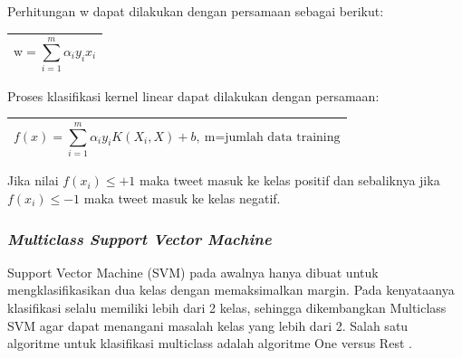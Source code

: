 \noindent Perhitungan w dapat dilakukan dengan persamaan sebagai berikut:	
\begin{table}[H]
	\small
	\begin{adjustbox}{width=1\textwidth}
	\begin{tabular}{|p{13.55cm}|}
		\hline
		\begin{equation}\label{eqn:weight}
			\textrm{w} = \sum_{i=1}^{m} \alpha_i  y_i x_i
		\end{equation}\\
		\hline
	\end{tabular}
	\end{adjustbox}
\end{table}
\noindent Proses klasifikasi kernel linear dapat dilakukan dengan persamaan:
\begin{table}[H]
	\small
	\begin{adjustbox}{width=1\textwidth}
	\begin{tabular}{|p{13.55cm}|}
		\hline
		\begin{equation}\label{eqn:f(x)}
	f(x)=\sum_{i=1}^{m}\alpha_i y_i K(X_i,X)+b,\ \textrm{m=jumlah data training}
		\end{equation}\\
		\hline
	\end{tabular}
	\end{adjustbox}
\end{table}
Jika nilai $f(x_i )\leq+1$ maka tweet masuk ke kelas positif dan sebaliknya jika $f(x_i )\leq-1$ maka tweet masuk ke kelas negatif. 

\subsubsection{\textit{Multiclass Support Vector Machine}}
Support Vector Machine (SVM) pada awalnya hanya dibuat untuk mengklasifikasikan dua kelas dengan memaksimalkan margin. Pada kenyataanya klasifikasi selalu memiliki lebih dari 2 kelas, sehingga dikembangkan Multiclass SVM agar dapat menangani masalah kelas yang lebih dari 2. Salah satu algoritme untuk klasifikasi multiclass adalah algoritme One versus Rest \cite{17}. 

